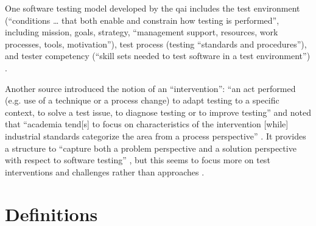 One software testing model developed by the \acf{qai} includes the test
environment (``conditions \dots
that both enable and constrain how testing is performed'', including mission,
goals, strategy, ``management support, resources, work processes, tools,
motivation''), test process (testing ``standards and procedures''), and tester
competency (``skill sets needed to test software in a test environment'')
\citep[pp.~5-6]{Perry2006}.

Another source
introduced the notion of an ``intervention'': ``an act performed (e.g. use of a
technique or a process change) to adapt testing
to a specific context, to solve
a test issue, to diagnose testing or to improve testing''
\citep[p.~1]{EngströmAndPetersen2015} and noted that ``academia tend[s] to focus on
characteristics of the intervention [while] industrial standards categorize the
area from a process perspective'' \citep[p.~2]{EngströmAndPetersen2015}.
It provides a structure to ``capture both a problem perspective and a solution
perspective with respect to software testing'' \citep[pp.~3-4]{EngströmAndPetersen2015},
but this seems to focus more on test interventions and challenges rather than
approaches \citep[Fig.~5]{EngströmAndPetersen2015}.

\section{Definitions}

